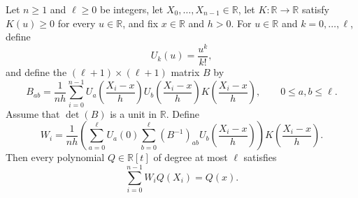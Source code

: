 \begin{theorem}
Let $n\geq 1$ and $\ell\geq 0$ be integers, let
$X_0,\ldots,X_{n-1}\in\mathbb R$, let $K:\mathbb R\to\mathbb R$ satisfy
$K(u)\geq 0$ for every $u\in\mathbb R$, and fix $x\in\mathbb R$ and
$h>0$.  For $u\in\mathbb R$ and $k=0,\ldots,\ell$, define
\[
  U_k(u)=\frac{u^k}{k!},
\]
and define the $(\ell+1)\times(\ell+1)$ matrix $B$ by
\[
  B_{ab}=\frac{1}{nh}\sum_{i=0}^{n-1}
  U_a\!\left(\frac{X_i-x}{h}\right)
  U_b\!\left(\frac{X_i-x}{h}\right)
  K\!\left(\frac{X_i-x}{h}\right),
  \qquad 0\leq a,b\leq\ell.
\]
Assume that $\det(B)$ is a unit in $\mathbb R$.  Define
\[
  W_i=\frac{1}{nh}
  \left(\sum_{a=0}^{\ell}U_a(0)
    \sum_{b=0}^{\ell}(B^{-1})_{ab}
      U_b\!\left(\frac{X_i-x}{h}\right)\right)
  K\!\left(\frac{X_i-x}{h}\right).
\]
Then every polynomial $Q\in\mathbb R[t]$ of degree at most $\ell$ satisfies
\[
  \sum_{i=0}^{n-1}W_i Q(X_i)=Q(x).
\]
\end{theorem}
